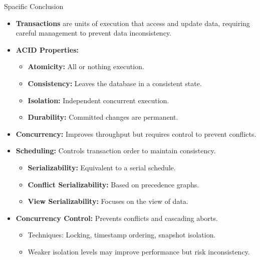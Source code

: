 \documentclass{beamer}
\begin{document}
\begin{frame}{Spacific Conclusion}
    \scriptsize
    \begin{itemize}
        \item \textbf{Transactions} are units of execution that access and update data, requiring careful management to prevent data inconsistency.
        \item \textbf{ACID Properties:}
        \begin{itemize}
            \scriptsize
            \item \textbf{Atomicity:} All or nothing execution.
            \item \textbf{Consistency:} Leaves the database in a consistent state.
            \item \textbf{Isolation:} Independent concurrent execution.
            \item \textbf{Durability:} Committed changes are permanent.
        \end{itemize}
        \item \textbf{Concurrency:} Improves throughput but requires control to prevent conflicts.
        \item \textbf{Scheduling:} Controls transaction order to maintain consistency.
        \begin{itemize}
            \scriptsize
            \item \textbf{Serializability:} Equivalent to a serial schedule.
            \item \textbf{Conflict Serializability:} Based on precedence graphs.
            \item \textbf{View Serializability:} Focuses on the view of data.
        \end{itemize}
        \item \textbf{Concurrency Control:} Prevents conflicts and cascading aborts.
        \begin{itemize}
            \item Techniques: Locking, timestamp ordering, snapshot isolation.
            \item Weaker isolation levels may improve performance but risk inconsistency.
        \end{itemize}
    \end{itemize}
\end{frame}

\end{document}
